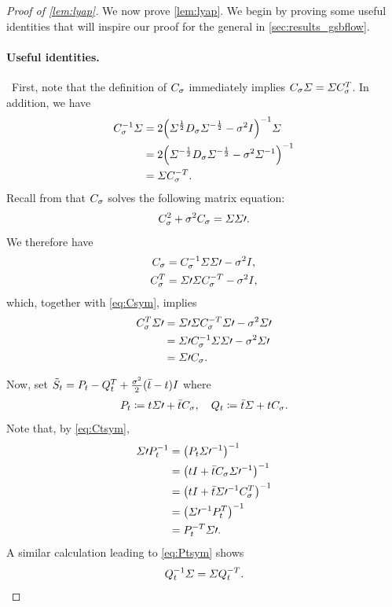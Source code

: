 \begin{proof}[Proof of \cref{lem:lyap}] 
We now prove \cref{lem:lyap}. We begin by proving some useful identities that will inspire our proof for the general  in \cref{sec:results_gsbflow}.

\paragraph{Useful identities.}
~First, note that the definition of $C_{\sigma}$ immediately implies $C_{\sigma} \Sigma = \Sigma C_{\sigma}^T $. In addition, we have
\begin{align}
\nn
\C^{-1} \Sigma &= 2\parens*{ \Sigma^{\frac{1}{2}} \D  \Sigma^{-\frac{1}{2}} - \sdev^2\eye }^{-1} \Sigma \\
\nn
&= 2 \parens*{ \Sigma^{-\frac{1}{2}} \D  \Sigma^{-\frac{1}{2}} - \sdev^2\Sigma^{-1} }^{-1} \\
\label{eq:Csym}
&= \Sigma \C^{-T }.
\end{align}
Recall from \citep{janati2020entropic} that $C_{\sigma}$ solves the following matrix equation:
\begin{align}
\label{eq:C}
\C^2 + \sdev^2\C =  \Sigma\Sigma\prime.
\end{align}
We therefore have
\begin{align*}
C_{\sigma} &= C_{\sigma}^{-1} \Sigma\Sigma\prime - \sigma^2I, \\
C_{\sigma}^T  &= \Sigma\prime\Sigma C_{\sigma}^{-T } - \sigma^2I,
\end{align*}which, together with \eqref{eq:Csym}, implies
\begin{align}
\nn
\C^T  \Sigma\prime &= \Sigma\prime\Sigma \C^{-T }\Sigma\prime-\sdev^2\Sigma\prime  \\
\nn
&=\Sigma\prime \C^{-1}\Sigma \Sigma\prime-\sdev^2\Sigma\prime   \\
\label{eq:Ctsym}
&= \Sigma\prime \C.
\end{align}


Now, set $\tilde{S}_{t} = P_{t} - Q_{t}^T  + \frac{\sigma^2}{2}(\bar{t}-t)I$ where
\begin{align}
P_{t} \coloneqq t \Sigma\prime + \bar{t} C_{\sigma}, \quad Q_{t} \coloneqq \bar{t} \Sigma + t C_{\sigma}.
\end{align}
Note that, by \eqref{eq:Ctsym}, 
\begin{align}
\nn
\Sigma\prime\Pt^{-1}  &= \parens*{ \Pt\Sigma\prime^{-1} }^{-1} \\
\nn
&= \parens*{\ctime\eye + \ctimebar  \C \Sigma\prime^{-1} }^{-1} \\
\nn
&=  \parens*{\ctime\eye + \ctimebar \Sigma\prime^{-1} \C^T   }^{-1} \\
\nn
&= \parens*{ \Sigma\prime^{-1} \Pt^T   }^{-1} \\
\label{eq:Ptsym}
&= \Pt^{-T }\Sigma\prime.
\end{align}A similar calculation leading to \eqref{eq:Ptsym} shows
\begin{align}
\label{eq:Qtsym}
\Qt^{-1} \Sigma = \Sigma\Qt^{-T }.
\end{align}


\end{proof}
